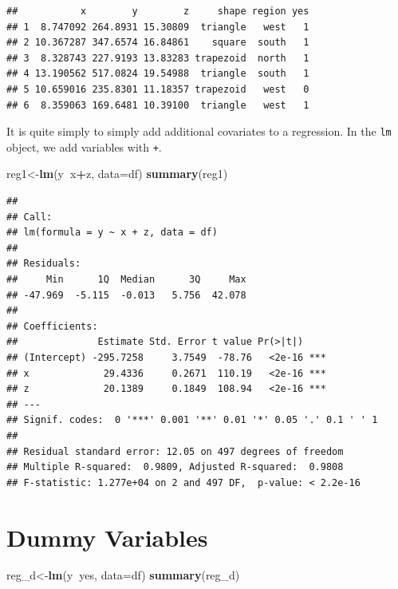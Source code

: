 \documentclass[]{book}
\newenvironment{Shaded}{\begin{snugshade}}{\end{snugshade}}
\newcommand{\KeywordTok}[1]{\textcolor[rgb]{0.13,0.29,0.53}{\textbf{#1}}}
\newcommand{\DataTypeTok}[1]{\textcolor[rgb]{0.13,0.29,0.53}{#1}}
\newcommand{\OperatorTok}[1]{\textcolor[rgb]{0.81,0.36,0.00}{\textbf{#1}}}
\newcommand{\NormalTok}[1]{#1}
\theoremstyle{definition}
\theoremstyle{definition}
\theoremstyle{definition}
\theoremstyle{remark}
\begin{document}
\begin{verbatim}
##           x        y        z     shape region yes
## 1  8.747092 264.8931 15.30809  triangle   west   1
## 2 10.367287 347.6574 16.84861    square  south   1
## 3  8.328743 227.9193 13.83283 trapezoid  north   1
## 4 13.190562 517.0824 19.54988  triangle  south   1
## 5 10.659016 235.8301 11.18357 trapezoid   west   0
## 6  8.359063 169.6481 10.39100  triangle   west   1
\end{verbatim}

It is quite simply to simply add additional covariates to a regression.
In the \texttt{lm} object, we add variables with \texttt{+}.

\begin{Shaded}
\begin{Highlighting}[]
\NormalTok{reg1<-}\KeywordTok{lm}\NormalTok{(y}\OperatorTok{~}\NormalTok{x}\OperatorTok{+}\NormalTok{z, }\DataTypeTok{data=}\NormalTok{df)}
\KeywordTok{summary}\NormalTok{(reg1)}
\end{Highlighting}
\end{Shaded}

\begin{verbatim}
## 
## Call:
## lm(formula = y ~ x + z, data = df)
## 
## Residuals:
##     Min      1Q  Median      3Q     Max 
## -47.969  -5.115  -0.013   5.756  42.078 
## 
## Coefficients:
##              Estimate Std. Error t value Pr(>|t|)    
## (Intercept) -295.7258     3.7549  -78.76   <2e-16 ***
## x             29.4336     0.2671  110.19   <2e-16 ***
## z             20.1389     0.1849  108.94   <2e-16 ***
## ---
## Signif. codes:  0 '***' 0.001 '**' 0.01 '*' 0.05 '.' 0.1 ' ' 1
## 
## Residual standard error: 12.05 on 497 degrees of freedom
## Multiple R-squared:  0.9809, Adjusted R-squared:  0.9808 
## F-statistic: 1.277e+04 on 2 and 497 DF,  p-value: < 2.2e-16
\end{verbatim}

\section{Dummy Variables}\label{dummy-variables}

\begin{Shaded}
\begin{Highlighting}[]
\NormalTok{reg_d<-}\KeywordTok{lm}\NormalTok{(y}\OperatorTok{~}\NormalTok{yes, }\DataTypeTok{data=}\NormalTok{df)}
\KeywordTok{summary}\NormalTok{(reg_d)}
\end{Highlighting}
\end{Shaded}
\end{document}
